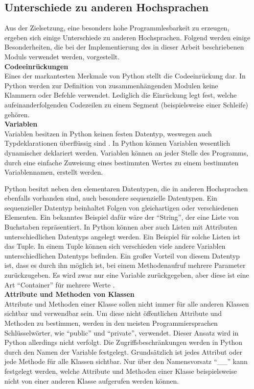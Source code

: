 \documentclass[12pt,a4paper]{report}
\begin{document}
\subsection{Unterschiede zu anderen Hochsprachen}\label{subsec:Unterschiede zu anderen Hochsprachen}
Aus der Zielsetzung, eine besonders hohe Programmlesbarkeit zu erzeugen, ergeben sich einige Unterschiede zu anderen Hochsprachen. Folgend werden einige Besonderheiten, die bei der Implementierung des in dieser Arbeit beschriebenen Moduls verwendet werden, vorgestellt.
\\[0.5cm]
\textbf{Codeeinrückungen}
\\Eines der markantesten Merkmale von Python stellt die Codeeinrückung dar. In Python werden zur Definition von zusammenhängenden Modulen keine Klammern oder Befehle verwendet. Lediglich die Einrückung legt fest, welche aufeinanderfolgenden Codezeilen zu einem Segment (beispielsweise einer Schleife) gehören.
\\[0.5cm]
\textbf{Variablen}
\\Variablen besitzen in Python keinen festen Datentyp, weswegen auch Typdeklarationen überflüssig sind \cite{GalileoPython}. In Python können Variablen wesentlich dynamischer deklariert werden. Variablen können an jeder Stelle des Programms, durch eine einfache Zuweisung eines bestimmten Wertes zu einem bestimmten Variablennamen, erstellt werden.

Python besitzt neben den elementaren Datentypen, die in anderen Hochsprachen ebenfalls vorhanden sind, auch besondere sequenzielle Datentypen. Ein sequenzieller Datentyp beinhaltet Folgen von gleichartigen oder verschiedenen Elementen. Ein bekanntes Beispiel dafür wäre der "`String"', der eine Liste von Buchstaben repräsentiert. In Python können aber auch Listen mit Attributen unterschiedlichen Datentyps angelegt werden. Ein Beispiel für solche Listen ist das Tuple. In einem Tuple können sich verschieden viele andere Variablen unterschiedlichen Datentyps befinden. Ein gro\ss er Vorteil von diesem Datentyp ist, dass es durch ihn möglich ist, bei einem Methodenaufruf mehrere Parameter zurückzugeben. Es wird zwar nur eine Variable zurückgegeben, aber diese ist eine Art "`Container"' für mehrere Werte  \cite{GalileoPython}.
\\[0.5cm]
\textbf{Attribute und Methoden von Klassen}
\\Attribute und Methoden einer Klasse sollen nicht immer für alle anderen Klassen sichtbar und verwendbar sein. Um diese nicht öffentlichen Attribute und Methoden zu bestimmen, werden in den meisten Programmiersprachen Schlüsselwörter, wie "`public"' und "`private"', verwendet. Dieser Ansatz wird in Python allerdings nicht verfolgt. Die Zugriffsbeschränkungen werden in Python durch den Namen der Variable festgelegt. Grundsätzlich ist jedes Attribut oder jede Methode für alle Klassen sichtbar. Nur über den Namensvorsatz "`\_\_"' kann festgelegt werden, welche Attribute und Methoden einer Klasse beispielsweise nicht von einer anderen Klasse aufgerufen werden können.
\end{document}
